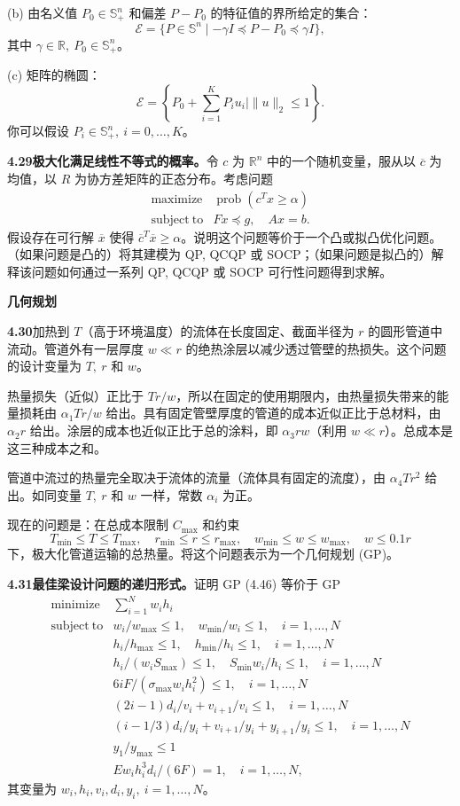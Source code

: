 \documentclass[UTF8, 12pt, fontset=fandol, oneside]{ctexart}
\begin{document}
(b) 由名义值 $P_0\in\mathbb{S}_+^n$ 和偏差 $P-P_0$ 的特征值的界所给定的集合：
\[
\mathcal{E}=\{P\in\mathbb{S}^n\mid -\gamma I\preceq P-P_0\preceq\gamma I\},
\]
其中 $\gamma\in\mathbb{R},\ P_0\in\mathbb{S}_+^n$。

(c) 矩阵的椭圆：
\[
\mathcal{E}=\left\{P_0+\sum_{i=1}^K P_iu_i\mid \|u\|_2\leq1\right\}.
\]
你可以假设 $P_i\in\mathbb{S}_+^n,\ i=0,\ldots,K$。

\noindent\textbf{4.29\quad 极大化满足线性不等式的概率。}\quad 令 $c$ 为 $\mathbb{R}^n$ 中的一个随机变量，服从以 $\overline{c}$ 为均值，以 $R$ 为协方差矩阵的正态分布。考虑问题
\[
\begin{array}{ll}
\mathop{\mathrm{maximize}} & \operatorname{prob}(c^Tx\geq\alpha)\\
\mathrm{subject\ to} & Fx\preceq g,\quad Ax=b.
\end{array}
\]
假设存在可行解 $\overline{x}$ 使得 $\overline{c}^T\overline{x}\geq\alpha$。说明这个问题等价于一个凸或拟凸优化问题。（如果问题是凸的）将其建模为 QP, QCQP 或 SOCP；（如果问题是拟凸的）解释该问题如何通过一系列 QP, QCQP 或 SOCP 可行性问题得到求解。

\noindent\textbf{几何规划}

\noindent\textbf{4.30}\quad 加热到 $T$（高于环境温度）的流体在长度固定、截面半径为 $r$ 的圆形管道中流动。管道外有一层厚度 $w\ll r$ 的绝热涂层以减少透过管壁的热损失。这个问题的设计变量为 $T,\ r$ 和 $w$。

热量损失（近似）正比于 $Tr/w$，所以在固定的使用期限内，由热量损失带来的能量损耗由 $\alpha_1Tr/w$ 给出。具有固定管壁厚度的管道的成本近似正比于总材料，由 $\alpha_2r$ 给出。涂层的成本也近似正比于总的涂料，即 $\alpha_3rw$（利用 $w\ll r$）。总成本是这三种成本之和。

管道中流过的热量完全取决于流体的流量（流体具有固定的流度），由 $\alpha_4Tr^2$ 给出。如同变量 $T,\ r$ 和 $w$ 一样，常数 $\alpha_i$ 为正。

现在的问题是：在总成本限制 $C_{\max}$ 和约束
\[
T_{\min}\leq T\leq T_{\max},\quad r_{\min}\leq r\leq r_{\max},\quad w_{\min}\leq w\leq w_{\max},\quad w\leq0.1r
\]
下，极大化管道运输的总热量。将这个问题表示为一个几何规划 (GP)。

\noindent\textbf{4.31\quad 最佳梁设计问题的递归形式。}\quad 证明 GP (4.46) 等价于 GP
\[
\begin{array}{ll}
\mathop{\mathrm{minimize}} & \displaystyle\sum_{i=1}^N w_ih_i\\
\mathrm{subject\ to} & w_i/w_{\max}\leq1,\quad w_{\min}/w_i\leq1,\quad i=1,\ldots,N\\
& h_i/h_{\max}\leq1,\quad h_{\min}/h_i\leq1,\quad i=1,\ldots,N\\
& h_i/(w_iS_{\max})\leq1,\quad S_{\min}w_i/h_i\leq1,\quad i=1,\ldots,N\\
& 6iF/(\sigma_{\max}w_ih_i^2)\leq1,\quad i=1,\ldots,N\\
& (2i-1)d_i/v_i+v_{i+1}/v_i\leq1,\quad i=1,\ldots,N\\
& (i-1/3)d_i/y_i+v_{i+1}/y_i+y_{i+1}/y_i\leq1,\quad i=1,\ldots,N\\
& y_1/y_{\max}\leq1\\
& Ew_ih_i^3d_i/(6F)=1,\quad i=1,\ldots,N,
\end{array}
\]
其变量为 $w_i,h_i,v_i,d_i,y_i,\ i=1,\ldots,N$。
\end{document}
